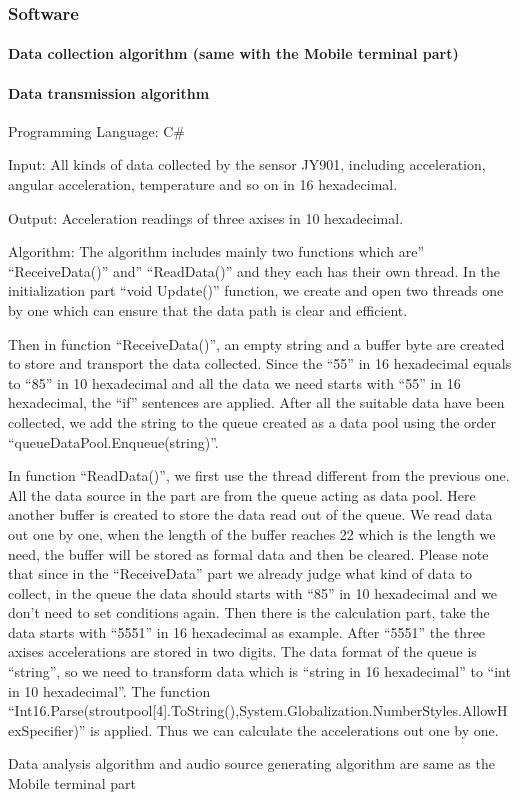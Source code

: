 \subsubsection{Software}
\paragraph{Data collection algorithm (same with the Mobile terminal part)}
\paragraph{Data transmission algorithm}

Programming Language: C\#

Input: All kinds of data collected by the sensor JY901, including acceleration,
angular acceleration, temperature and so on in 16 hexadecimal.   

Output: Acceleration readings of three axises in 10 hexadecimal. 

Algorithm: The algorithm includes mainly two functions which are''
``ReceiveData()'' and'' ``ReadData()'' and they each has their own thread. In
the initialization part “void Update()” function, we create and open two threads
one by one which can ensure that the data path is clear and efficient. 

Then in function ``ReceiveData()'', an empty string and a buffer byte are
created to store and transport the data collected. Since the “55” in 16
hexadecimal equals to “85” in 10 hexadecimal and all the data we need starts
with “55” in 16 hexadecimal, the “if” sentences are applied. After all the
suitable data have been collected, we add the string to the queue created as a
data pool using the order “queueDataPool.Enqueue(string)”. 

In function ``ReadData()'', we first use the thread different from the previous
one. All the data source in the part are from the queue acting as data pool.
Here another buffer is created to store the data read out of the queue. We read
data out one by one, when the length of the buffer reaches 22 which is the
length we need, the buffer will be stored as formal data and then be cleared.
Please note that since in the “ReceiveData” part we already judge what kind of
data to collect, in the queue the data should starts with “85” in 10 hexadecimal
and we don’t need to set conditions again. Then there is the calculation part,
take the data starts with “5551” in 16 hexadecimal as example. After “5551” the
three axises accelerations are stored in two digits. The data format of the
queue is “string”, so we need to transform data which is “string in 16
hexadecimal” to “int in 10 hexadecimal”. The function
“Int16.Parse(stroutpool[4].ToString(),System.Globalization.NumberStyles.AllowHexSpecifier)” 
is applied. Thus we can calculate the accelerations out one by one.

Data analysis algorithm and audio source generating algorithm are same as the Mobile terminal part
